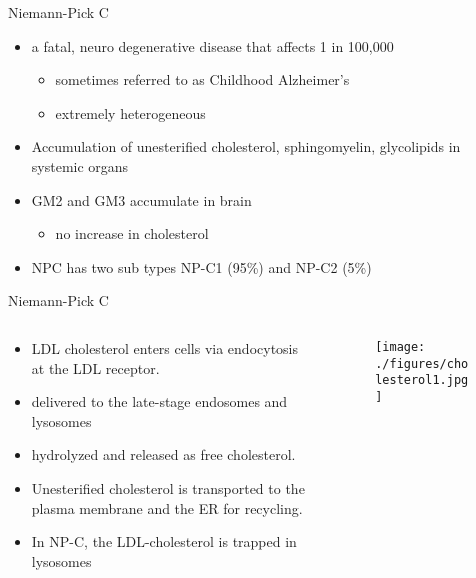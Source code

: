 \documentclass[presentation, smaller]{beamer}
\begin{document}
\begin{frame}[label={sec:orgheadline4}]{Niemann-Pick C}
\begin{itemize}
\item a fatal, neuro degenerative disease that affects 1 in 100,000
\begin{itemize}
\item sometimes referred to as Childhood Alzheimer’s
\item extremely heterogeneous
\end{itemize}
\item Accumulation of unesterified cholesterol, sphingomyelin, glycolipids in systemic organs
\item GM2 and GM3 accumulate in brain
\begin{itemize}
\item no increase in cholesterol
\end{itemize}
\item NPC has two sub types NP-C1 (95\%) and NP-C2 (5\%)
\end{itemize}
\end{frame}


\begin{frame}[label={sec:orgheadline5}]{Niemann-Pick C}
\begin{columns}
\begin{column}{0.5\columnwidth}
\begin{itemize}
\item LDL cholesterol enters cells via endocytosis at the LDL receptor.
\item delivered to the late-stage endosomes and lysosomes
\item hydrolyzed and released as free cholesterol.
\item Unesterified cholesterol is transported to the plasma membrane and the ER for recycling.

\item In NP-C, the LDL-cholesterol is trapped in lysosomes
\end{itemize}
\end{column}

\begin{column}{0.5\columnwidth}
\begin{figure}[htb]
\centering
\texttt{[image: ./figures/cholesterol1.jpg]}
\label{fig:}
\end{figure}
\end{column}
\end{columns}
\end{frame}
\end{document}
